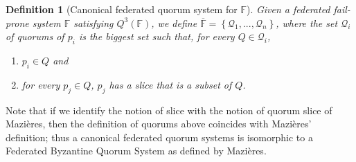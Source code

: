 \documentclass[11pt]{article}
\newtheorem{definition}{Definition}
\begin{document}
\begin{definition}[Canonical federated quorum system for $\mathbb{F}$]
  Given a federated fail-prone system $\mathbb{F}$ satisfying $Q^3(\mathbb{F})$, we define $\overline{\mathbb{F}}=\left\{\mathcal{Q}_1,...,\mathcal{Q}_n\right\}$, where the set $\mathcal{Q}_i$ of quorums of $p_i$ is the biggest set such that, for every $Q\in\mathcal{Q}_i$,
  \begin{enumerate}
    \item $p_i\in Q$ and
    \item for every $p_j\in Q$, $p_j$ has a slice that is a subset of $Q$.%
  \end{enumerate}
\end{definition}

Note that if we identify the notion of slice with the notion of quorum slice of Mazières, then the definition of quorums above coincides with Mazières' definition; thus a canonical federated quorum systems is isomorphic to a Federated Byzantine Quorum System as defined by Mazières.
\end{document}
